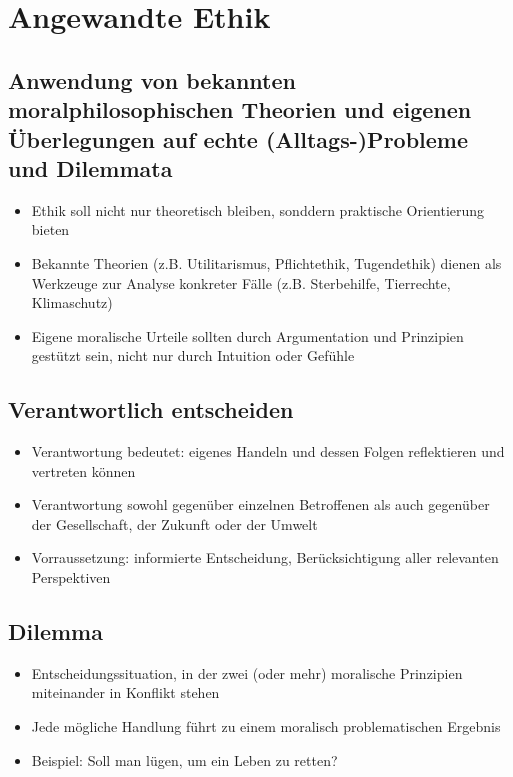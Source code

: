 
\section{Angewandte Ethik}

\subsection{Anwendung von bekannten moralphilosophischen Theorien und eigenen Überlegungen auf echte (Alltags-)Probleme und Dilemmata}
\begin{itemize}
    \item Ethik soll nicht nur theoretisch bleiben, sonddern praktische Orientierung bieten
    \item Bekannte Theorien (z.B. Utilitarismus, Pflichtethik, Tugendethik) dienen als Werkzeuge zur Analyse konkreter Fälle (z.B. Sterbehilfe, Tierrechte, Klimaschutz)
    \item Eigene moralische Urteile sollten durch Argumentation und Prinzipien gestützt sein, nicht nur durch Intuition oder Gefühle
\end{itemize}

\subsection{Verantwortlich entscheiden}
\begin{itemize}
    \item Verantwortung bedeutet: eigenes Handeln und dessen Folgen reflektieren und vertreten können
    \item Verantwortung sowohl gegenüber einzelnen Betroffenen als auch gegenüber der Gesellschaft, der Zukunft oder der Umwelt
    \item Vorraussetzung: informierte Entscheidung, Berücksichtigung aller relevanten Perspektiven
\end{itemize}

\subsection{Dilemma}
\begin{itemize}
    \item Entscheidungssituation, in der zwei (oder mehr) moralische Prinzipien miteinander in Konflikt stehen
    \item Jede mögliche Handlung führt zu einem moralisch problematischen Ergebnis 
    \item Beispiel: Soll man lügen, um ein Leben zu retten?
\end{itemize}

